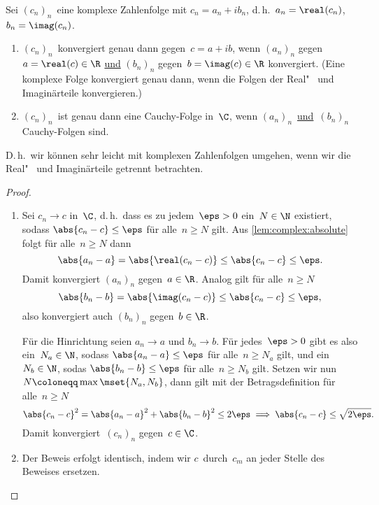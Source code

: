 \documentclass[a4paper]{article}
\begin{document}
\begin{theorem}
    Sei $(c_n)_n$~eine komplexe Zahlenfolge mit $c_n = a_n+ib_n$, d.\,h.\ $a_n = \real(c_n)$, $b_n = \imag(c_n)$.
    \begin{enumerate}
        \item $(c_n)_n$~konvergiert genau dann gegen~$c = a+ib$, wenn $(a_n)_n$ gegen~$a = \real(c) \in \R$ \underline{und} $(b_n)_n$ gegen~$b = \imag(c) \in \R$ konvergiert. (Eine komplexe Folge konvergiert genau dann, wenn die Folgen der Real"~ und Imaginärteile konvergieren.)
        \item $(c_n)_n$~ist genau dann eine Cauchy-Folge in~$\C$, wenn $(a_n)_n$~\underline{und}~$(b_n)_n$ Cauchy-Folgen sind.
    \end{enumerate}
\end{theorem}

D.\,h.\ wir können sehr leicht mit komplexen Zahlenfolgen umgehen, wenn wir die Real"~ und Imaginärteile getrennt betrachten.

\begin{proof}\leavevmode
    \begin{enumerate}
        \item Sei $c_n \to c$ in~$\C$, d.\,h.\ dass es zu jedem~$\eps > 0$ ein~$N \in \N$ existiert, sodass $\abs{c_n-c} \leq \eps$ für alle~$n \geq N$ gilt. Aus \cref{lem:complex:absolute} folgt für alle~$n \geq N$ dann
        \begin{equation*}
            \abs{a_n-a} = \abs{\real(c_n-c)} \leq \abs{c_n-c} \leq \eps.
        \end{equation*}
        Damit konvergiert $(a_n)_n$ gegen~$a \in \R$. Analog gilt für alle~$n \geq N$
        \begin{equation*}
            \abs{b_n-b} = \abs{\imag(c_n-c)} \leq \abs{c_n-c} \leq \eps,
        \end{equation*}
        also konvergiert auch $(b_n)_n$ gegen~$b \in \R$.

        Für die Hinrichtung seien $a_n \to a$ und $b_n \to b$. Für jedes~$\eps > 0$ gibt es also ein~$N_a \in \N$, sodass $\abs{a_n-a} \leq \eps$ für alle~$n \geq N_a$ gilt, und ein~$N_b \in \N$, sodas $\abs{b_n-b} \leq \eps$ für alle~$n \geq N_b$ gilt. Setzen wir nun $N \coloneqq \max\mset{N_a,N_b}$, dann gilt mit der Betragsdefinition für alle~$n \geq N$
        \begin{equation*}
            \abs{c_n-c}^2 = \abs{a_n-a}^2 + \abs{b_n-b}^2 \leq 2\eps \implies \abs{c_n-c} \leq \sqrt{2\eps}.
        \end{equation*}
        Damit konvergiert~$(c_n)_n$ gegen~$c \in \C$.
        \item Der Beweis erfolgt identisch, indem wir $c$~durch~$c_m$ an jeder Stelle des Beweises ersetzen.\qedhere
    \end{enumerate}
\end{proof}
\end{document}
